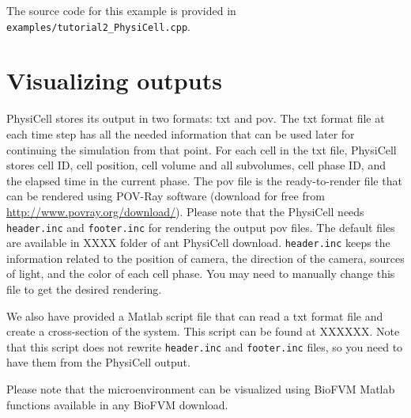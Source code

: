 \documentclass[11pt]{article}
\begin{document}
The source code for this example is provided in \verb:examples/tutorial2_PhysiCell.cpp:.


\section{Visualizing outputs}
\label{visualzing_output}
PhysiCell stores its output in two formats: txt and pov. The txt format file at each time step has all the needed information that can be used later for continuing the simulation from that point. For each cell in the txt file, PhysiCell stores cell ID, cell position, cell volume and all subvolumes, cell phase ID, and the elapsed time in the current phase. The pov file is the ready-to-render file that can be rendered using POV-Ray software (download for free from \url{http://www.povray.org/download/}). Please note that the PhysiCell needs \verb:header.inc: and \verb:footer.inc: for rendering the output pov files. The default files are available in XXXX folder of ant PhysiCell download. \verb:header.inc: keeps the information related to the position of camera, the direction of the camera, sources of light, and the color of each cell phase. You may need to manually change this file to get the desired rendering.

We also have provided a Matlab script file that can read a txt format file and create a cross-section of the system. This script can be found at XXXXXX. Note that this script does not rewrite \verb:header.inc: and \verb:footer.inc: files, so you need to have them from the PhysiCell output. 

Please note that the microenvironment can be visualized using BioFVM Matlab functions available in any BioFVM download. 
\end{document}
